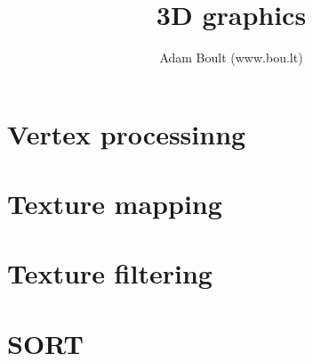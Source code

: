 \documentclass[oneside]{book}
\begin{document}
\author{Adam Boult (www.bou.lt)}
\title{3D graphics}
\maketitle

\setcounter{tocdepth}{0}
\tableofcontents



\part{Vertex processinng}



\part{Texture mapping}


\part{Texture filtering}


\part{SORT}

\end{document}
